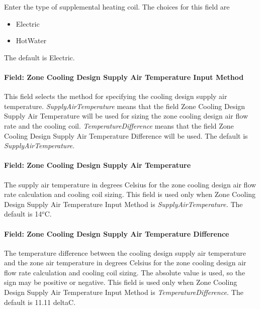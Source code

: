 Enter the type of supplemental heating coil. The choices for this field are

\begin{itemize}
\item
  Electric
\item
  HotWater
\end{itemize}

The default is Electric.

\paragraph{Field: Zone Cooling Design Supply Air Temperature Input Method}\label{field-zone-cooling-design-supply-air-temperature-input-method-3}

This field selects the method for specifying the cooling design supply air temperature. \emph{SupplyAirTemperature} means that the field Zone Cooling Design Supply Air Temperature will be used for sizing the zone cooling design air flow rate and the cooling coil. \emph{TemperatureDifference} means that the field Zone Cooling Design Supply Air Temperature Difference will be used. The default is \emph{SupplyAirTemperature.}

\paragraph{Field: Zone Cooling Design Supply Air Temperature}\label{field-zone-cooling-design-supply-air-temperature-2}

The supply air temperature in degrees Celsius for the zone cooling design air flow rate calculation and cooling coil sizing. This field is used only when Zone Cooling Design Supply Air Temperature Input Method is \emph{SupplyAirTemperature.} The default is 14\(^{o}\)C.

\paragraph{Field: Zone Cooling Design Supply Air Temperature Difference}\label{field-zone-cooling-design-supply-air-temperature-difference-3}

The temperature difference between the cooling design supply air temperature and the zone air temperature in degrees Celsius for the zone cooling design air flow rate calculation and cooling coil sizing. The absolute value is used, so the sign may be positive or negative. This field is used only when Zone Cooling Design Supply Air Temperature Input Method is \emph{TemperatureDifference.} The default is 11.11 deltaC.

